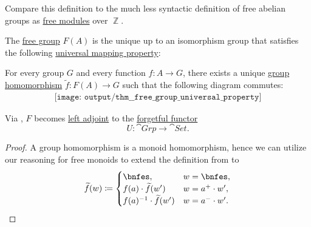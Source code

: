 \begin{comments}
  \item Compare this definition to the much less syntactic definition of free abelian groups as \hyperref[def:free_semimodule]{free modules} over \( \BbbZ \).
\end{comments}

\begin{theorem}\label{thm:free_group_universal_property}
  The \hyperref[def:free_group]{free group} \( F(A) \) is the unique up to an isomorphism group that satisfies the following \hyperref[rem:universal_mapping_property]{universal mapping property}:
  \begin{displayquote}
    For every group \( G \) and every function \( f: A \to G \), there exists a unique \hyperref[def:group/homomorphism]{group homomorphism} \( \widetilde{f}: F(A) \to G \) such that the following diagram commutes:
    \begin{equation}\label{eq:thm:free_group_universal_property/diagram}
      \begin{aligned}
        \texttt{[image: output/thm\_\_free\_group\_universal\_property]}
      \end{aligned}
    \end{equation}
  \end{displayquote}
\end{theorem}
\begin{comments}
  \item Via , \( F \) becomes \hyperref[def:category_adjunction]{left adjoint} to the \hyperref[def:concrete_category]{forgetful functor}
  \begin{equation*}
    U: \cat{Grp} \to \cat{Set}.
  \end{equation*}
\end{comments}
\begin{proof}
  A group homomorphism is a monoid homomorphism, hence we can utilize our reasoning for free monoids to extend the definition from  to
  \begin{equation*}
    \widetilde{f}(w) \coloneqq \begin{cases}
      \bnfes,                      &w = \bnfes, \\
      f(a) \cdot \widetilde{f}(w')      &w = a^+ \cdot w', \\
      f(a)^{-1} \cdot \widetilde{f}(w') &w = a^- \cdot w'.
    \end{cases}
  \end{equation*}
\end{proof}

